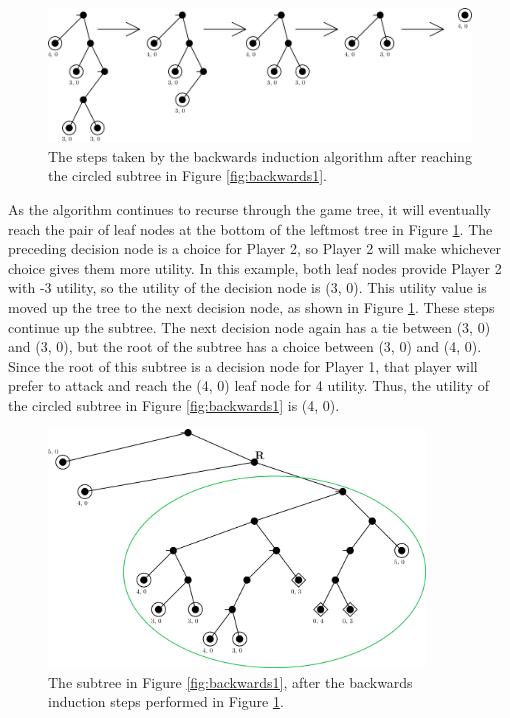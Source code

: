 \begin{figure}[H]
  \centering
  \includegraphics[width=12cm]{figures/Backwards2.png}
  \caption{The steps taken by the backwards induction algorithm after reaching the circled subtree in Figure \ref{fig:backwards1}.}
  \label{fig:backwards2}
\end{figure}
As the algorithm continues to recurse through the game tree, it will eventually reach the pair of leaf nodes at the bottom of the leftmost tree in Figure \ref{fig:backwards2}. The preceding decision node is a choice for Player 2, so Player 2 will make whichever choice gives them more utility. In this example, both leaf nodes provide Player 2 with -3 utility, so the utility of the decision node is (3, 0). This utility value is moved up the tree to the next decision node, as shown in Figure \ref{fig:backwards2}. These steps continue up the subtree. The next decision node again has a tie between (3, 0) and (3, 0), but the root of the subtree has a choice between (3, 0) and (4, 0). Since the root of this subtree is a decision node for Player 1, that player will prefer to attack and reach the (4, 0) leaf node for 4 utility. Thus, the utility of the circled subtree in Figure \ref{fig:backwards1} is (4, 0).\\

\begin{figure}[H]
  \centering
  \includegraphics[width=10cm]{figures/Backwards3.png}
  \caption{The subtree in Figure \ref{fig:backwards1}, after the backwards induction steps performed in Figure \ref{fig:backwards2}.}
  \label{fig:backwards3}
\end{figure}

